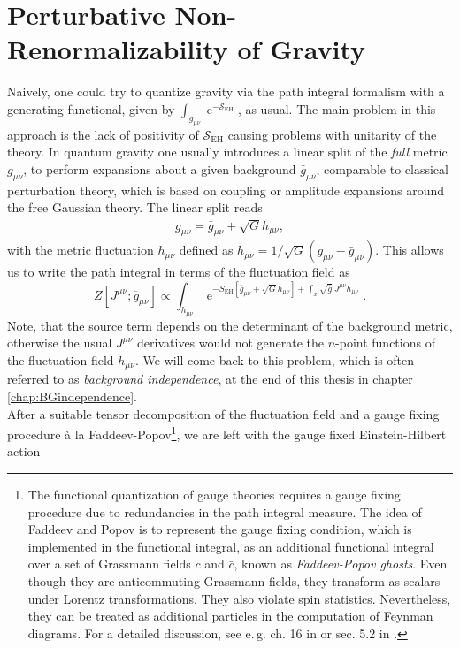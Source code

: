 \section{Perturbative Non-Renormalizability of Gravity}
Naively, one could try to quantize gravity via the path integral formalism with a generating functional, given by $\int_{g_{\mu\nu}} \operatorname{e}^{-\mathcal{S}_{\mathrm{EH}}}$, as usual. The main problem in this approach is the lack of positivity of $\mathcal{S}_{\mathrm{EH}}$ causing problems with unitarity of the theory. In quantum gravity one usually introduces a linear split of the \textit{full} metric $g_{\mu\nu}$, to perform expansions about a given background $\bar{g}_{\mu\nu}$, comparable to classical perturbation theory, which is based on coupling or amplitude expansions around the free Gaussian theory. The linear split reads
\begin{align}
	g_{\mu\nu} = \bar{g}_{\mu\nu} + \sqrt{G}h_{\mu\nu},
	\label{eqn:metric_split}
\end{align}
with the metric fluctuation $h_{\mu\nu}$ defined as $h_{\mu\nu}= 1/\sqrt{G}\left(g_{\mu\nu}-\bar{g}_{\mu\nu}\right)$. This allows us to write the path integral in terms of the fluctuation field as
\begin{equation}
Z\left[J^{\mu \nu} ; \overline{g}_{\mu \nu}\right] \propto \int_{h_{\mu \nu}} \operatorname{e}^{-S_{\mathrm{EH}}\left[\bar{g}_{\mu \nu}+\sqrt{G} h_{\mu \nu}\right]+\int_x \sqrt{\bar{g}} \  J^{\mu \nu} h_{\mu \nu}}.
\end{equation}
Note, that the source term depends on the determinant of the background metric, otherwise the usual $J^{\mu\nu}$ derivatives would not generate the $n$-point functions of the fluctuation field $h_{\mu\nu}$. We will come back to this problem, which is often referred to as \textit{background independence}, at the end of this thesis in chapter \ref{chap:BGindependence}. \\
After a suitable tensor decomposition of the fluctuation field and a gauge fixing procedure \`a la Faddeev-Popov\footnote{The functional quantization of gauge theories requires a gauge fixing procedure due to redundancies in the path integral measure. The idea of Faddeev and Popov is to represent the gauge fixing condition, which is implemented in the functional integral, as an additional functional integral over a set of Grassmann fields $c$ and $\bar{c}$, known as \textit{Faddeev-Popov ghosts}. Even though they are anticommuting Grassmann fields, they transform as scalars under Lorentz transformations. They also violate spin statistics. Nevertheless, they can be treated as additional particles in the computation of Feynman diagrams. For a detailed discussion, see e.\,g. ch. 16 in \cite{PeskinSchroeder1995} or  sec. 5.2 in \cite{PawlowskiNPgaugeLecture}.},  we are left with the gauge fixed Einstein-Hilbert action

